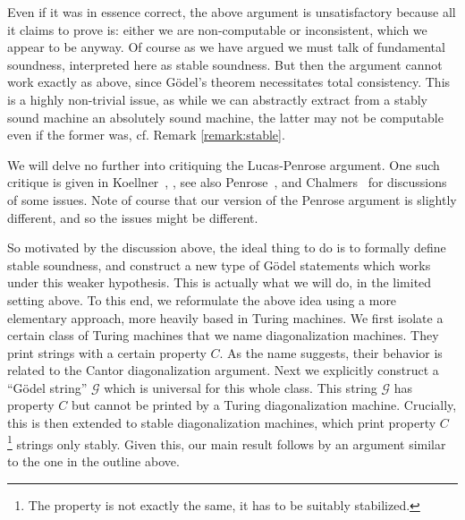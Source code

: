 \documentclass{amsart}  %
\numberwithin{equation}{section}
\theoremstyle{definition}
\theoremstyle{remark}
\begin{document}
{Even if it was in essence correct, the above argument is unsatisfactory because all it claims to prove is:  either we are non-computable or inconsistent, which we appear to be anyway. Of course as we have argued we must talk of fundamental soundness, interpreted here as stable soundness.
But then the argument cannot work exactly as above, since G\"odel's theorem necessitates total consistency. This is a highly  non-trivial issue, as while we can abstractly extract from a stably sound machine an absolutely sound machine, the latter may not be computable even if the former was, cf. Remark \ref{remark:stable}.  

We will delve no further into critiquing the Lucas-Penrose argument. One such critique is given in Koellner~\cite{citeKoellner2018-KOEOTQ-3}, \cite{citeKoellnerII2018-KOEOTQ-4},  see also Penrose~\cite{citePenroseBeyondShadow}, and Chalmers~\cite{citeChalmers} for discussions of some issues.  Note of course that our version of the Penrose argument is slightly different, and so the issues might be different.  

So motivated by the discussion above, the ideal thing to do is to formally define stable soundness, and construct a new type of G\"odel statements which works under this weaker hypothesis. This is actually what we will do, in the limited setting above.
To this end, we reformulate the above idea using a more elementary approach, more heavily based in Turing machines. We first isolate a certain class of Turing machines that we name diagonalization machines.
They print strings with a certain property $C$. As the name suggests, their behavior is related to the Cantor diagonalization argument.  Next we explicitly construct a ``G\"odel string'' $\mathcal{G}$ which is universal for this whole class. 
This string $\mathcal{G}$ has property $C$ but cannot be printed by a Turing diagonalization machine. Crucially, this is then extended to stable diagonalization machines, which print property  $C$ \footnote {The property is not exactly the same, it has to be suitably stabilized.} strings only stably. Given this, our main result follows by an argument similar to the one in the outline above.  

}
\end{document}
